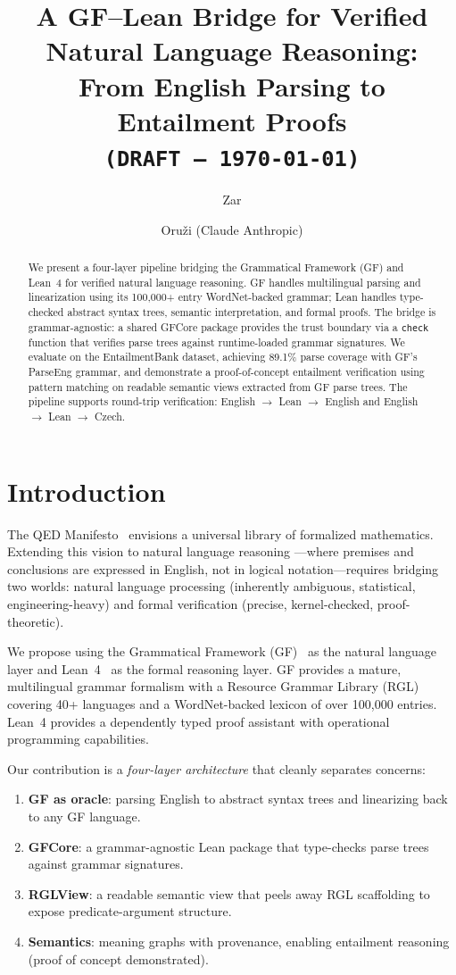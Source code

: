 \documentclass[]{article}
\title{A GF--Lean Bridge for Verified Natural Language Reasoning:\\
  From English Parsing to Entailment Proofs\\
  \texttt{(DRAFT --- \today)}}
\author{Zar \and Oru\v{z}i (Claude Anthropic)}
\newcommand{\code}[1]{\texttt{#1}}
\newcommand{\GFCore}{\textup{GFCore}}
\begin{document}
\maketitle

\begin{abstract}
We present a four-layer pipeline bridging the Grammatical Framework (GF)
and Lean~4 for verified natural language reasoning. GF handles
multilingual parsing and linearization using its 100{,}000+ entry
WordNet-backed grammar; Lean handles type-checked abstract syntax trees,
semantic interpretation, and formal proofs. The bridge is grammar-agnostic:
a shared \GFCore{} package provides the trust boundary via a \code{check}
function that verifies parse trees against runtime-loaded grammar signatures.
We evaluate on the EntailmentBank dataset, achieving 89.1\% parse coverage
with GF's ParseEng grammar, and demonstrate a proof-of-concept entailment
verification using pattern matching on readable semantic views extracted
from GF parse trees. The pipeline supports round-trip verification:
English $\to$ Lean $\to$ English and English $\to$ Lean $\to$ Czech.
\end{abstract}

\section{Introduction}
\label{sec:intro}

The QED Manifesto~\cite{qed1994} envisions a universal library of
formalized mathematics. Extending this vision to natural language reasoning
---where premises and conclusions are expressed in English, not in logical
notation---requires bridging two worlds: natural language processing
(inherently ambiguous, statistical, engineering-heavy) and formal
verification (precise, kernel-checked, proof-theoretic).

We propose using the Grammatical Framework (GF)~\cite{ranta2004gf,ranta2011gf}
as the natural language layer and Lean~4~\cite{demoura2021lean4} as the
formal reasoning layer. GF provides a mature, multilingual grammar
formalism with a Resource Grammar Library (RGL) covering 40+ languages
and a WordNet-backed lexicon of over 100{,}000 entries. Lean~4 provides
a dependently typed proof assistant with operational programming
capabilities.

Our contribution is a \emph{four-layer architecture} that cleanly
separates concerns:

\begin{enumerate}
\item \textbf{GF as oracle}: parsing English to abstract syntax trees
  and linearizing back to any GF language.
\item \textbf{GFCore}: a grammar-agnostic Lean package that type-checks
  parse trees against grammar signatures.
\item \textbf{RGLView}: a readable semantic view that peels away
  RGL scaffolding to expose predicate-argument structure.
\item \textbf{Semantics}: meaning graphs with provenance, enabling
  entailment reasoning (proof of concept demonstrated).
\end{enumerate}
\end{document}
